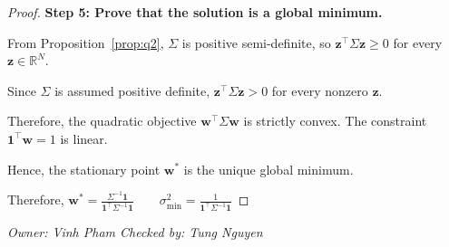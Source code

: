 \documentclass[11pt]{article}
\theoremstyle{plain}
\theoremstyle{definition}
\newcommand{\one}{\mathbf{1}}
\newcommand{\w}{\bm{w}}
\newcommand{\owner}[2]{\par\smallskip\noindent\textit{Owner: #1 \quad Checked by: #2}\par}
\begin{document}
\begin{proof}
\textbf{Step 5: Prove that the solution is a global minimum.}

From Proposition~\ref{prop:q2}, $\Sigma$ is
positive semi-definite, so
$\bm z^\top\Sigma\bm z\geq 0$
for every $\bm z\in\mathbb{R}^N$.

Since $\Sigma$ is assumed positive definite,
$\bm z^\top\Sigma\bm z>0$
for every nonzero $\bm z$.

Therefore, the quadratic objective
$\w^\top\Sigma\w$ is strictly convex.
The constraint $\one^\top\w=1$ is linear.

Hence, the stationary point $\w^*$ is the
unique global minimum.

Therefore,
$\w^*=\frac{\Sigma^{-1}\one}
{\one^\top\Sigma^{-1}\one}
\qquad
\sigma_{\min}^2
=\frac{1}{\one^\top\Sigma^{-1}\one}$
\end{proof}
\owner{Vinh Pham}{Tung Nguyen}
\end{document}
